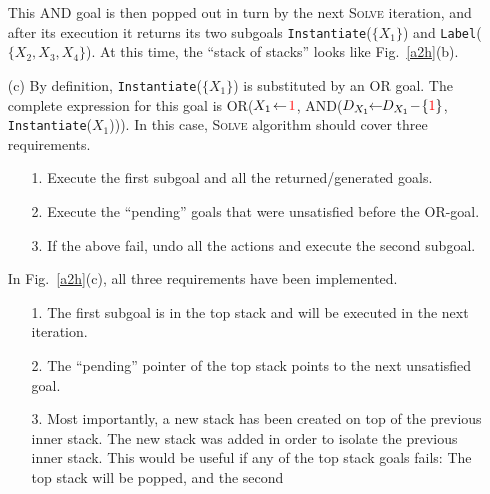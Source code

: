 \documentclass{ws-ijait}
\begin{document}
\begin{enumerate}
             This \textsf{AND} goal is then popped out in
             turn by the next \textsc{Solve} iteration, and
             after its execution it returns its two subgoals
             \texttt{Instantiate}($\{X_1\}$) and
             \texttt{Label}($\{X_2, X_3, X_4\}$). At this
             time, the ``stack of stacks'' looks like
             Fig.~\ref{a2h}(b).
  \item[(c)] By definition, \texttt{Instantiate}($\{X_1\}$)
             is substituted by an \textsf{OR} goal. The
             complete expression for this goal is
             \textsf{OR}($X_1 \! \gets \!
             \textcolor{red}{1}$, \textsf{AND}($D_{X_1} \!\!
             \gets \!\! D_{X_1} \! - \!
             \{\textcolor{red}{1}\}$,\,\texttt{Instantiate}($X_1$))).
             In this case, \textsc{Solve} algorithm should
             cover three requirements.
             \begin{enumerate}
               \item[1.] Execute the first subgoal and all
                         the returned\slash generated goals.
               \item[2.] Execute the ``pending'' goals that
                         were unsatisfied before the
                         \textsf{OR}-goal.
               \item[3.] If the above fail, undo all the
                         actions and execute the second
                         subgoal.
             \end{enumerate}
             In Fig.~\ref{a2h}(c), all three requirements
             have been implemented.
             \begin{enumerate}
               \item[1.] The first subgoal is in the top
                         stack and will be executed in the
                         next iteration.
               \item[2.] The ``pending'' pointer of the top
                         stack points to the next
                         unsatisfied goal.
               \item[3.] Most importantly, a new stack has
                         been created on top of the previous
                         inner stack. The new stack was
                         added in order to isolate the
                         previous inner stack. This would be
                         useful if any of the top stack
                         goals fails: The top stack will be
                         popped, and the second

\end{enumerate}
\end{enumerate}
\end{document}
